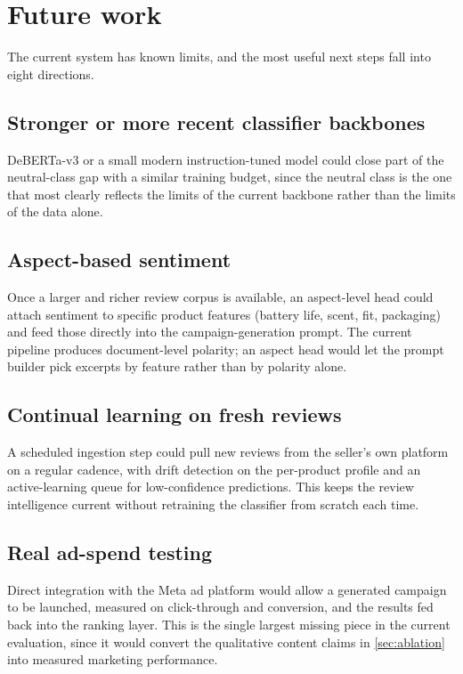 \documentclass[12pt,a4paper]{report}
\begin{document}
\section{Future work}
\label{sec:future}

The current system has known limits, and the most useful next steps fall into eight directions.

\subsection{Stronger or more recent classifier backbones}

DeBERTa-v3 or a small modern instruction-tuned model could close part of the neutral-class gap with a similar training budget, since the neutral class is the one that most clearly reflects the limits of the current backbone rather than the limits of the data alone.

\subsection{Aspect-based sentiment}

Once a larger and richer review corpus is available, an aspect-level head could attach sentiment to specific product features (battery life, scent, fit, packaging) and feed those directly into the campaign-generation prompt. The current pipeline produces document-level polarity; an aspect head would let the prompt builder pick excerpts by feature rather than by polarity alone.

\subsection{Continual learning on fresh reviews}

A scheduled ingestion step could pull new reviews from the seller's own platform on a regular cadence, with drift detection on the per-product profile and an active-learning queue for low-confidence predictions. This keeps the review intelligence current without retraining the classifier from scratch each time.

\subsection{Real ad-spend testing}

Direct integration with the Meta ad platform would allow a generated campaign to be launched, measured on click-through and conversion, and the results fed back into the ranking layer. This is the single largest missing piece in the current evaluation, since it would convert the qualitative content claims in \cref{sec:ablation} into measured marketing performance.
\end{document}
